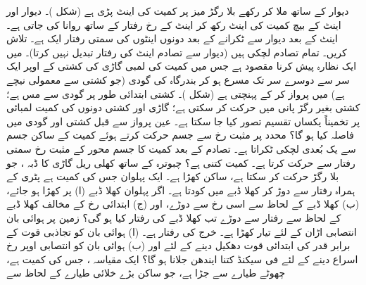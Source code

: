 دیوار کے ساتھ ملا کر رکھے بلا رگڑ  میز  پر  کمیت کی اینٹ   پڑی ہے (شکل )۔ دیوار اور اینٹ کے بیچ   کمیت کی اینٹ  رکھ کر  اینٹ  کے رخ   رفتار کے ساتھ روانا کی جاتی ہے۔   اینٹ  کے بعد دیوار سے ٹکرانے کے بعد  دونوں اینٹوں کی  سمتی رفتار ایک ہے۔  تلاش کریں۔ تمام تصادم لچکی ہیں (دیوار سے تصادم اینٹ کی رفتار تبدیل نہیں کرتا)۔
 میں ایک نظارہ پیش کرنا مقصود ہے جس میں   کمیت    کی   لمبی گاڑی  کی  کشتی کے  اوپر ایک سر سے دوسرے سر تک  مسرع ہو کر  بندرگاہ  کی گودی (جو کشتی سے معمولی نیچے ہے)  میں  پرواز کر کے پہنچتی ہے (شکل )۔ کشتی ابتدائی طور پر گودی سے  مس  ہے؛ کشتی بغیر رگڑ پانی میں حرکت کر سکتی ہے؛ گاڑی اور کشتی دونوں کی کمیت لمبائی  پر تخمیناً یکساں   تقسیم تصور کیا جا سکتا ہے۔ عین  پرواز سے قبل کشتی اور گودی میں فاصلہ کیا ہو گا؟
محدد  پر مثبت رخ   سے  جسم  حرکت کرتے ہوئے کمیت  کے ساکن جسم سے یک بُعدی لچکی  ٹکراتا ہے۔  تصادم کے بعد  کمیت  کا جسم  محور کے مثبت رخ  سمتی رفتار سے حرکت کرتا ہے۔ کمیت  کتنی ہے؟
چبوترہ  کے ساتھ کھلی   ریل گاڑی  کا   ڈبہ ، جو بلا رگڑ حرکت کر سکتا ہے، ساکن کھڑا ہے۔ ایک پہلوان جس کی کمیت  ہے پٹری  کے ہمراہ  رفتار سے دوڑ کر  کھلا ڈبے میں کودتا ہے۔  اگر پہلوان کھلا ڈبے (ا) پر کھڑا ہو جائے، (ب) کھلا ڈبے کے لحاظ سے اسی رخ  سے دوڑے، اور (ج) ابتدائی رخ کے مخالف کھلا ڈبے کے لحاظ سے   رفتار سے دوڑے  تب کھلا ڈبے کی رفتار کیا ہو گی؟
زمین پر  ہوائی بان انتصابی اڑان کے لئے تیار کھڑا ہے۔  خرج کی رفتار  ہے۔ (ا) ہوائی بان کو تجاذبی قوت کے برابر قدر کی ابتدائی  قوت دھکیل دینے کے لئے اور (ب)   ہوائی بان کو انتصابی اوپر رخ  اسراع دینے کے لئے  فی سیکنڈ  کتنا ایندھن جلانا ہو گا؟
ایک مقیاسہ ، جس کی کمیت  ہے، چھوٹے  طیارے سے  جڑا ہے، جو ساکن بڑے خلائی طیارے کے لحاظ سے 
